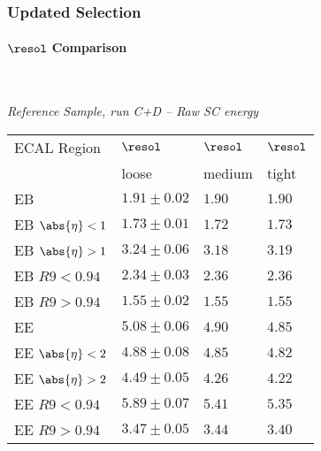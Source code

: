 \documentclass[8pt,serif]{beamer}
\begin{document}
\begin{frame}
\frametitle{Updated Selection}
 \framesubtitle{$ \resol $ Comparison}
\\
  \begin{center}
    \emph{Reference Sample, run C+D -- Raw SC energy}
\vspace{15mm}

\tiny \begin{tabular}{|l|p{30pt}|p{18pt}|p{18pt}|} \hline  
ECAL Region &  $\resol$ &  $\resol$ &  $\resol$ \\ 
 &  loose &  medium &  tight \\ 
\hline     
EB & $1.91 \pm 0.02$ & $1.90$ & $1.90$ \\
EB $\abs{\eta} < 1$ & $1.73 \pm 0.01$ & $1.72$ & $1.73$ \\
EB $\abs{\eta} > 1$ & $3.24 \pm 0.06$ & $3.18$ & $3.19$ \\
EB $R9 < 0.94$ & $2.34 \pm 0.03$ & $2.36$ & $2.36$ \\
EB $R9 > 0.94$ & $1.55 \pm 0.02$ & $1.55$ & $1.55$ \\
\hline     
\hline     
EE & $5.08 \pm 0.06$ & $4.90$ & $4.85$ \\
EE $\abs{\eta} < 2$ & $4.88 \pm 0.08$ & $4.85$ & $4.82$ \\
EE $\abs{\eta} > 2$ & $4.49 \pm 0.05$ & $4.26$ & $4.22$ \\
EE $R9 < 0.94$ & $5.89 \pm 0.07$ & $5.41$ & $5.35$ \\
EE $R9 > 0.94$ & $3.47 \pm 0.05$ & $3.44$ & $3.40$ \\
\hline  
\end{tabular} 
  \end{center}


\end{frame}
\end{document}
